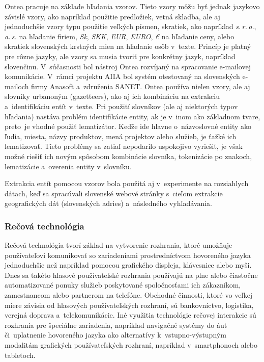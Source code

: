 \begin{multicols}{2}
Ontea pracuje na základe hľadania vzorov. Tieto vzory môžu byť
jednak jazykovo závislé vzory, ako napríklad použitie predložiek,
vetná skladba, ale aj jednoduchšie vzory typu použitie veľkých
písmen, skratiek, ako napríklad \emph{s.\,r.\,o.}, \emph{a.\,s.} na
hľadanie firiem, \emph{Sk}, \emph{SKK}, \emph{EUR}, \emph{EURO},
\emph{€} na hľadanie ceny, alebo skratiek slovenských krstných
mien na hľadanie osôb v~texte. Princíp je platný pre rôzne jazyky,
ale vzory sa musia tvoriť pre konkrétny jazyk, napríklad slovenčinu.
V~súčasnosti bol nástroj Ontea rozvíjaný na spracovanie e-mailovej
komunikácie. V~rámci projektu
AIIA\cite{f29} \cite{laclavik2010} bol
systém otestovaný na slovenských e-mailoch firmy Anasoft a~združenia
SANET. Ontea používa nielen vzory, ale aj slovníky urbanoným
(gazetteers), ako aj ich kombináciu na extrakciu a~identifikáciu
entít v~texte. Pri použití slovníkov (ale aj niektorých typov
hľadania) nastáva problém identifikácie entity, ak je v~inom ako
základnom tvare, preto~je vhodné použiť lematizátor. Keďže ide
hlavne o~názvoslovné entity ako ľudia, miesta, názvy produktov,
mená projektov alebo služieb, je ťažké ich lematizovať. Tieto
problémy sa zatiaľ nepodarilo uspokojivo vyriešiť, je však možné
riešiť ich novým spôsobom kombinácie slovníka, tokenizácie po
znakoch, lematizácie a~overenia entity v~slovníku.

Extrakcia entít pomocou vzorov bola použitá aj v~experimente na rozsiahlych dátach, keď sa spracúvali slovenské webové stránky s~cieľom extrakcie geografických dát (slovenských adries) a~následného vyhľadávania\cite{dlugolinsky2010}.

\subsubsection{Rečová technológia}
Rečová technológia tvorí základ na vytvorenie rozhrania, ktoré umožňuje používateľovi komunikovať so zariadeniami prostredníctvom hovoreného jazyka jednoduchšie než napríklad pomocou grafického displeja, klávesnice alebo myši. Dnes sa takéto hlasové používateľské rozhrania používajú na plne alebo čiastočne automatizované ponuky služieb poskytované spoločnosťami ich zákazníkom, zamestnancom alebo partnerom na telefóne. Obchodné činnosti, ktoré vo veľkej miere závisia od hlasových používateľských rozhraní, sú bankovníctvo, logistika, verejná doprava a~telekomunikácie. Iné využitia technológie rečovej interakcie sú rozhrania pre špeciálne zariadenia, napríklad navigačné systémy do  áut či~uplatnenie hovoreného jazyka ako alternatívy k~vstupno-výstupným modalitám grafických používateľských rozhraní, napríklad v~smartphonoch alebo tabletoch. 


\end{multicols}
